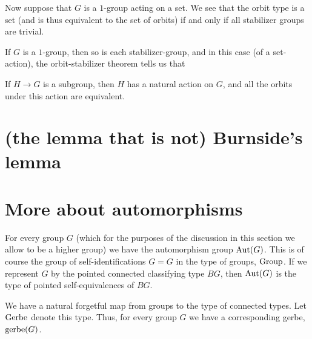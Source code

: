Now suppose that $G$ is a $1$-group acting on a set.
We see that the orbit type is a set
(and is thus equivalent to the set of orbits)
if and only if
all stabilizer groups are trivial.

If $G$ is a $1$-group,
then so is each stabilizer-group,
and in this case (of a set-action),
the orbit-stabilizer theorem
tells us that 

\begin{theorem}
  If $H \to G$ is a subgroup, then $H$ has a natural action on $G$,
  and all the orbits under this action are equivalent.
\end{theorem}

\section{(the lemma that is not) Burnside's lemma}


\section{More about automorphisms}

For every group $G$ (which for the purposes of the discussion
in this section we allow to be a higher group)
we have the automorphism group $\operatorname{Aut}(G)$.
This is of course the group of self-identifications $G = G$ in the type of groups, $\mathord{\mathrm{Group}}$.
If we represent $G$ by the pointed connected classifying type $BG$,
then $\operatorname{Aut}(G)$ is the type of pointed self-equivalences of $BG$.

We have a natural forgetful map from groups to the type of connected types.
Let $\mathord{\mathrm{Gerbe}}$ denote this type.
Thus, for every group $G$ we have a corresponding gerbe, $\operatorname{gerbe}(G)$.

